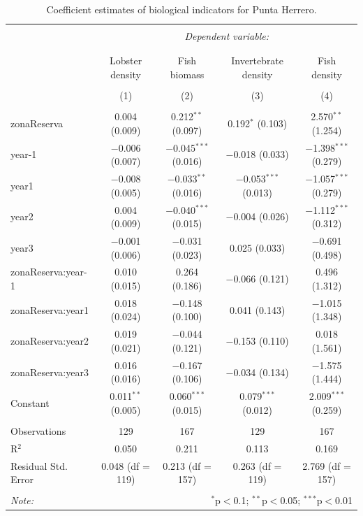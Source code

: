 \documentclass[10pt]{article}
\begin{document}
\begin{table}[h] \centering 
  \caption{Coefficient estimates of biological indicators for Punta Herrero.} 
  \label{} 
\small 
\begin{tabular}{@{\extracolsep{1pt}}lcccc} 
\\[-1.8ex]\hline 
\hline \\[-1.8ex] 
 & \multicolumn{4}{c}{\textit{Dependent variable:}} \\ 
\cline{2-5} 
\\[-1.8ex] & \multicolumn{4}{c}{} \\ 
 & Lobster density & Fish biomass & Invertebrate density & Fish density \\ 
\\[-1.8ex] & (1) & (2) & (3) & (4)\\ 
\hline \\[-1.8ex] 
 zonaReserva & 0.004 (0.009) & 0.212$^{**}$ (0.097) & 0.192$^{*}$ (0.103) & 2.570$^{**}$ (1.254) \\ 
  year-1 & $-$0.006 (0.007) & $-$0.045$^{***}$ (0.016) & $-$0.018 (0.033) & $-$1.398$^{***}$ (0.279) \\ 
  year1 & $-$0.008 (0.005) & $-$0.033$^{**}$ (0.016) & $-$0.053$^{***}$ (0.013) & $-$1.057$^{***}$ (0.279) \\ 
  year2 & 0.004 (0.009) & $-$0.040$^{***}$ (0.015) & $-$0.004 (0.026) & $-$1.112$^{***}$ (0.312) \\ 
  year3 & $-$0.001 (0.006) & $-$0.031 (0.023) & 0.025 (0.033) & $-$0.691 (0.498) \\ 
  zonaReserva:year-1 & 0.010 (0.015) & 0.264 (0.186) & $-$0.066 (0.121) & 0.496 (1.312) \\ 
  zonaReserva:year1 & 0.018 (0.024) & $-$0.148 (0.100) & 0.041 (0.143) & $-$1.015 (1.348) \\ 
  zonaReserva:year2 & 0.019 (0.021) & $-$0.044 (0.121) & $-$0.153 (0.110) & 0.018 (1.561) \\ 
  zonaReserva:year3 & 0.016 (0.016) & $-$0.167 (0.106) & $-$0.034 (0.134) & $-$1.575 (1.444) \\ 
  Constant & 0.011$^{**}$ (0.005) & 0.060$^{***}$ (0.015) & 0.079$^{***}$ (0.012) & 2.009$^{***}$ (0.259) \\ 
 \hline \\[-1.8ex] 
Observations & 129 & 167 & 129 & 167 \\ 
R$^{2}$ & 0.050 & 0.211 & 0.113 & 0.169 \\ 
Residual Std. Error & 0.048 (df = 119) & 0.213 (df = 157) & 0.263 (df = 119) & 2.769 (df = 157) \\ 
\hline 
\hline \\[-1.8ex] 
\textit{Note:}  & \multicolumn{4}{r}{$^{*}$p$<$0.1; $^{**}$p$<$0.05; $^{***}$p$<$0.01} \\ 
\end{tabular} 
\end{table} 
 
\end{document}
